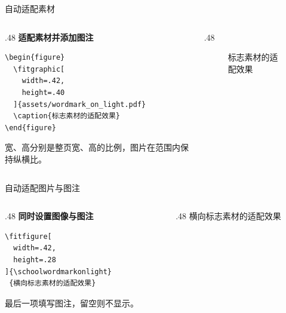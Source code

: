 \begin{frame}[fragile]{自动适配素材}
      \graphicspath{{theme/general/}}
      \begin{columns}[T,onlytextwidth]
            \begin{column}{.48\textwidth}
                  \textbf{适配素材并添加图注}
                  \begin{verbatim}
\begin{figure}
  \fitgraphic[
    width=.42,
    height=.40
  ]{assets/wordmark_on_light.pdf}
  \caption{标志素材的适配效果}
\end{figure}
                  \end{verbatim}
                  宽、高分别是整页宽、高的比例，图片在范围内保持纵横比。
            \end{column}
            \begin{column}{.48\textwidth}
                  \begin{figure}
                        \caption{标志素材的适配效果}
                  \end{figure}
            \end{column}
      \end{columns}
\end{frame}

\begin{frame}[fragile]{自动适配图片与图注}
      \begin{columns}[T,onlytextwidth]
            \begin{column}{.48\textwidth}
                  \textbf{同时设置图像与图注}
                  \begin{verbatim}
\fitfigure[
  width=.42,
  height=.28
]{\schoolwordmarkonlight}
 {横向标志素材的适配效果}
                  \end{verbatim}
                  最后一项填写图注，留空则不显示。
            \end{column}
            \begin{column}{.48\textwidth}
                  \fitfigure[width=.42,height=.28]{\schoolwordmarkonlight}%
                        {横向标志素材的适配效果}
            \end{column}
      \end{columns}
\end{frame}

